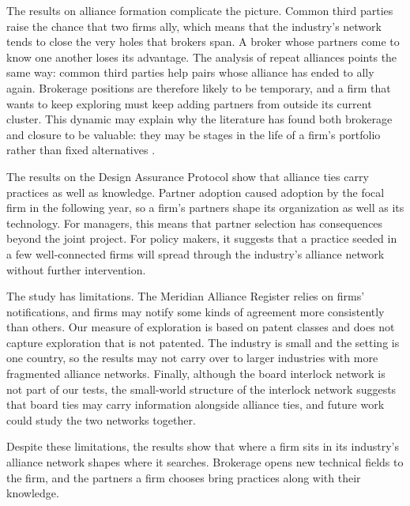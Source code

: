 \documentclass[12pt]{article}
\begin{document}
The results on alliance formation complicate the picture. Common third parties raise the chance that two firms ally, which means that the industry's network tends to close the very holes that brokers span. A broker whose partners come to know one another loses its advantage. The analysis of repeat alliances points the same way: common third parties help pairs whose alliance has ended to ally again. Brokerage positions are therefore likely to be temporary, and a firm that wants to keep exploring must keep adding partners from outside its current cluster. This dynamic may explain why the literature has found both brokerage and closure to be valuable: they may be stages in the life of a firm's portfolio rather than fixed alternatives \citep{zaheersoda2009,gulati2012}.

The results on the Design Assurance Protocol show that alliance ties carry practices as well as knowledge. Partner adoption caused adoption by the focal firm in the following year, so a firm's partners shape its organization as well as its technology. For managers, this means that partner selection has consequences beyond the joint project. For policy makers, it suggests that a practice seeded in a few well-connected firms will spread through the industry's alliance network without further intervention.

The study has limitations. The Meridian Alliance Register relies on firms' notifications, and firms may notify some kinds of agreement more consistently than others. Our measure of exploration is based on patent classes and does not capture exploration that is not patented. The industry is small and the setting is one country, so the results may not carry over to larger industries with more fragmented alliance networks. Finally, although the board interlock network is not part of our tests, the small-world structure of the interlock network suggests that board ties may carry information alongside alliance ties, and future work could study the two networks together.

Despite these limitations, the results show that where a firm sits in its industry's alliance network shapes where it searches. Brokerage opens new technical fields to the firm, and the partners a firm chooses bring practices along with their knowledge.
\end{document}
